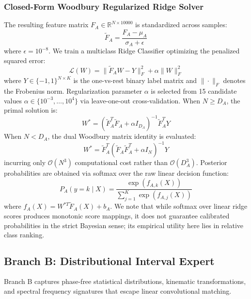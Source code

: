\documentclass[journal,twocolumn]{article}
\begin{document}
\subsubsection{Closed-Form Woodbury Regularized Ridge Solver}
The resulting feature matrix $F_A \in \mathbb{R}^{N \times 10000}$ is standardized across samples:
\begin{equation}
    \tilde{F}_A = \frac{F_A - \mu_A}{\sigma_A + \epsilon}
    \label{eq:standardize}
\end{equation}
where $\epsilon = 10^{-8}$. We train a multiclass Ridge Classifier optimizing the penalized squared error:
\begin{equation}
    \mathcal{L}(W) = \| \tilde{F}_A W - Y \|_F^2 + \alpha \| W \|_F^2
    \label{eq:ridge_loss}
\end{equation}
where $Y \in \{-1, 1\}^{N \times K}$ is the one-vs-rest binary label matrix and $\|\cdot\|_F$ denotes the Frobenius norm. Regularization parameter $\alpha$ is selected from 15 candidate values $\alpha \in \{10^{-3}, \dots, 10^4\}$ via leave-one-out cross-validation. When $N \ge D_A$, the primal solution is:
\begin{equation}
    W^* = (\tilde{F}_A^T \tilde{F}_A + \alpha I_{D_A})^{-1} \tilde{F}_A^T Y
    \label{eq:ridge_solution}
\end{equation}
When $N < D_A$, the dual Woodbury matrix identity is evaluated:
\begin{equation}
    W^* = \tilde{F}_A^T (\tilde{F}_A \tilde{F}_A^T + \alpha I_N)^{-1} Y
    \label{eq:woodbury}
\end{equation}
incurring only $\mathcal{O}(N^3)$ computational cost rather than $\mathcal{O}(D_A^3)$. Posterior probabilities are obtained via softmax over the raw linear decision function:
\begin{equation}
    P_A(y = k \mid X) = \frac{\exp(f_{A, k}(X))}{\sum_{j=1}^K \exp(f_{A, j}(X))}
    \label{eq:softmax_a}
\end{equation}
where $f_{A}(X) = W^{*T} \tilde{F}_A(X) + b_A$. We note that while softmax over linear ridge scores produces monotonic score mappings, it does not guarantee calibrated probabilities in the strict Bayesian sense; its empirical utility here lies in relative class ranking.

\subsection{Branch B: Distributional Interval Expert}
Branch B captures phase-free statistical distributions, kinematic transformations, and spectral frequency signatures that escape linear convolutional matching.
\end{document}
